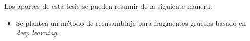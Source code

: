 Los aportes de esta tesis se pueden resumir de la siguiente manera:
\begin{itemize}
    \item Se plantea un método de reensamblaje para fragmentos gruesos basado en \textit{deep learning}.
\end{itemize}